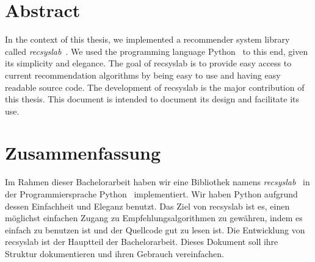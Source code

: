\begingroup
\let\clearpage\relax
\let\cleardoublepage\relax
\let\cleardoublepage\relax

\chapter*{Abstract}
In the context of this thesis, we implemented a recommender system library called \textit{recsyslab}~\cite{recsyslab}. We used the programming language Python~\cite{python} to this end, given its simplicity and elegance. The goal of recsyslab is
to provide easy access to current recommendation algorithms by being easy to use and 
having easy readable source code.
The development of recsyslab is the major contribution of this thesis. 
This document is intended to document its design and facilitate its use.


\vfill

\chapter*{Zusammenfassung}
Im Rahmen dieser Bachelorarbeit haben wir eine Bibliothek namens \textit{recsyslab}~\cite{recsyslab} 
in der Programmiersprache Python~\cite{python} implementiert. Wir haben Python aufgrund dessen Einfachheit und Eleganz benutzt. Das Ziel von recsyslab ist es, einen m\"oglichst einfachen Zugang zu 
Empfehlungsalgorithmen zu gew\"ahren, indem es einfach zu benutzen ist und der Quellcode gut zu lesen ist.
Die Entwicklung von recsyslab ist der Hauptteil der Bachelorarbeit.
Dieses Dokument soll ihre Struktur dokumentieren und ihren Gebrauch vereinfachen.


\endgroup			

\vfill

\cleardoublepage
